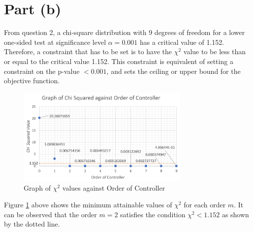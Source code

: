 \documentclass[12pt,a4paper]{article}
\begin{document}
	\section{Part (b)}
	From question 2, a chi-square distribution with 9 degrees of freedom for a lower one-sided test at significance level $\alpha = 0.001$ has a critical value of 1.152. Therefore, a constraint that has to be set is to have the $\chi^2$ value to be less than or equal to the critical value 1.152. This constraint is equivalent of setting a constraint on the p-value $<0.001$, and sets the ceiling or upper bound for the objective function.
	\begin{figure}[H]
		\begin{center}
			\includegraphics[width=0.75\textwidth]{chi.png}
			\caption{Graph of $\chi^2$ values against Order of Controller}
			\label{fig:chi}
		\end{center}
	\end{figure}

	Figure \ref{fig:chi} above shows the minimum attainable values of $\chi^2$ for each order $m$. It can be observed that the order $m = 2$ satisfies the condition $\chi^2 < 1.152$ as shown by the dotted line.\\
	
\end{document}
